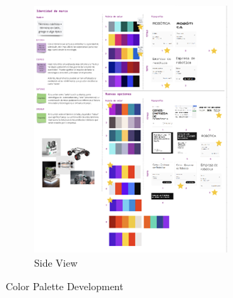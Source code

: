 \documentclass{article}
\begin{document}
\begin{itemize}
\begin{figure}[H]
\begin{subfigure}{.5\textwidth}
        \end{subfigure}%
        \begin{subfigure}{.5\textwidth}
          \centering
          \includegraphics[width=.8\linewidth]{Images/Design/ColorsV2.png}
          \caption{Side View}
          
        \end{subfigure}
        \caption{Color Palette Development}
        
    \end{figure}

\end{itemize}
\end{document}
